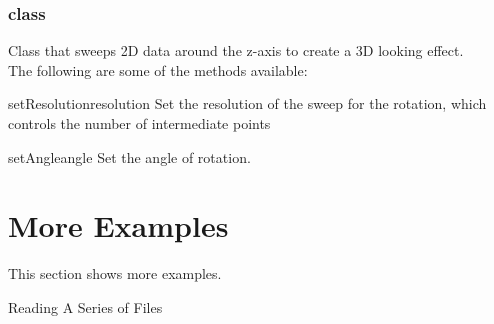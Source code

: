 \subsubsection{\Rotation class}
Class that sweeps 2D data around the z-axis to create a 3D looking effect. \\

The following are some of the methods available:

\begin{methoddesc}[Rotation]{setResolution}{resolution}
Set the resolution of the sweep for the rotation, which controls the
number of intermediate points
\end{methoddesc}

\begin{methoddesc}[Rotation]{setAngle}{angle}
Set the angle of rotation.
\end{methoddesc}




\section{More Examples}
This section shows more examples.

\textsf{Reading A Series of Files}

